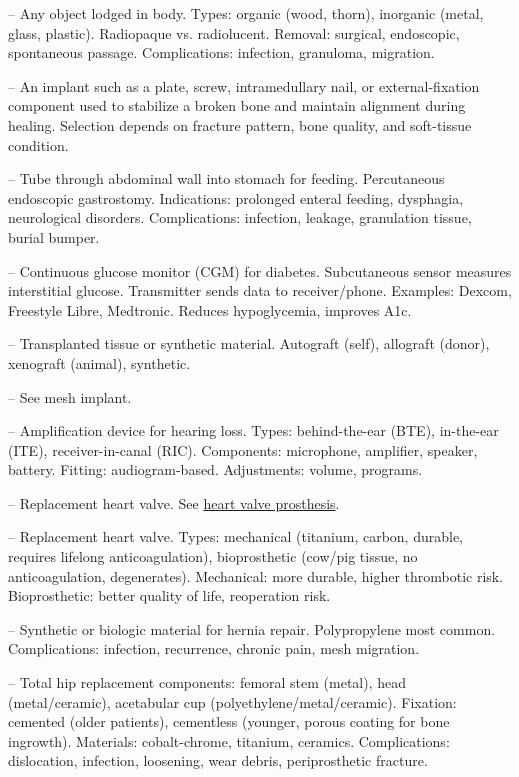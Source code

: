 -- Any object lodged in body. Types: organic (wood, thorn), inorganic (metal, glass, plastic). Radiopaque vs. radiolucent. Removal: surgical, endoscopic, spontaneous passage. Complications: infection, granuloma, migration.

-- An implant such as a plate, screw, intramedullary nail, or external-fixation component used to stabilize a broken bone and maintain alignment during healing. Selection depends on fracture pattern, bone quality, and soft-tissue condition.

-- Tube through abdominal wall into stomach for feeding. Percutaneous endoscopic gastrostomy. Indications: prolonged enteral feeding, dysphagia, neurological disorders. Complications: infection, leakage, granulation tissue, burial bumper.

-- Continuous glucose monitor (CGM) for diabetes. Subcutaneous sensor measures interstitial glucose. Transmitter sends data to receiver/phone. Examples: Dexcom, Freestyle Libre, Medtronic. Reduces hypoglycemia, improves A1c.

-- Transplanted tissue or synthetic material. Autograft (self), allograft (donor), xenograft (animal), synthetic.

-- See mesh implant.

-- Amplification device for hearing loss. Types: behind-the-ear (BTE), in-the-ear (ITE), receiver-in-canal (RIC). Components: microphone, amplifier, speaker, battery. Fitting: audiogram-based. Adjustments: volume, programs.

-- Replacement heart valve. See \hyperlink{Heart Valve Prosthesis}{heart valve prosthesis}.

-- Replacement heart valve. Types: mechanical (titanium, carbon, durable, requires lifelong anticoagulation), bioprosthetic (cow/pig tissue, no anticoagulation, degenerates). Mechanical: more durable, higher thrombotic risk. Bioprosthetic: better quality of life, reoperation risk.

-- Synthetic or biologic material for hernia repair. Polypropylene most common. Complications: infection, recurrence, chronic pain, mesh migration.

-- Total hip replacement components: femoral stem (metal), head (metal/ceramic), acetabular cup (polyethylene/metal/ceramic). Fixation: cemented (older patients), cementless (younger, porous coating for bone ingrowth). Materials: cobalt-chrome, titanium, ceramics. Complications: dislocation, infection, loosening, wear debris, periprosthetic fracture.


